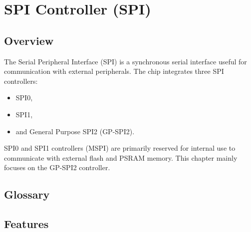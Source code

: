 \documentclass[main\_\_EN.tex]{subfiles}
\begin{document}

\ifglobal
\else
    {\let\clearpage\relax \listoftodos}
    \tableofcontents
\fi


\hypertarget{spi}{}
\chapter{SPI Controller (SPI)}
\label{mod:spi}


\section{Overview}

The Serial Peripheral Interface (SPI) is a synchronous serial interface useful for communication with external peripherals.
The \chipname{} chip integrates three SPI controllers:
\begin{itemize}
  \item SPI0,
  \item SPI1,
  \item and General Purpose SPI2 (GP-SPI2).
\end{itemize}

SPI0 and SPI1 controllers (MSPI) are primarily reserved for internal use to communicate with external flash and PSRAM memory. This chapter mainly focuses on the GP-SPI2 controller.

\section{Glossary}


\section{Features}
\end{document}
